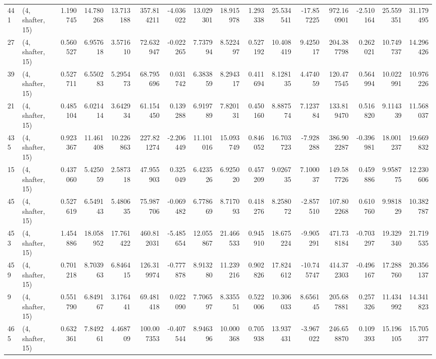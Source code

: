 \begin{tabular}{llrrrrrrrrrrrrrr}
441 &  (4, shafter, 15) &   1.190745 &  14.780268 &  13.713188 &   357.814211 &  -4.036022 &  13.029301 &  18.915978 &  1.293338 &  25.534541 & -17.857225 &   972.160901 & -2.510164 &  25.559351 &  31.179495 \\
27  &  (4, shafter, 15) &   0.560527 &   6.957618 &   3.571610 &    72.632947 &  -0.022265 &   7.737994 &   8.522497 &  0.527192 &  10.408419 &   9.425017 &   204.387798 &  0.262021 &  10.749737 &  14.296426 \\
39  &  (4, shafter, 15) &   0.527711 &   6.550283 &   5.295473 &    68.795696 &   0.031742 &   6.383859 &   8.294317 &  0.411694 &   8.128135 &   4.474059 &   120.477545 &  0.564994 &  10.022991 &  10.976226 \\
21  &  (4, shafter, 15) &   0.485104 &   6.021414 &   3.642934 &    61.154450 &   0.139288 &   6.919789 &   7.820131 &  0.450160 &   8.887574 &   7.123784 &   133.819470 &  0.516820 &   9.114339 &  11.568037 \\
435 &  (4, shafter, 15) &   0.923367 &  11.461408 &  10.226863 &   227.821274 &  -2.206449 &  11.101016 &  15.093749 &  0.846052 &  16.703723 &  -7.928288 &   386.902287 & -0.396981 &  18.001237 &  19.669832 \\
15  &  (4, shafter, 15) &   0.437060 &   5.425059 &   2.587318 &    47.955903 &   0.325049 &   6.423526 &   6.925020 &  0.457209 &   9.026735 &   7.100037 &   149.587726 &  0.459886 &   9.958775 &  12.230606 \\
45  &  (4, shafter, 15) &   0.527619 &   6.549143 &   5.480635 &    75.987706 &  -0.069482 &   6.778669 &   8.717093 &  0.418276 &   8.258072 &  -2.857510 &   107.802268 &  0.610760 &   9.981829 &  10.382787 \\
453 &  (4, shafter, 15) &   1.454886 &  18.058952 &  17.761422 &   460.812031 &  -5.485654 &  12.055867 &  21.466533 &  0.945910 &  18.675224 &  -9.905291 &   471.738184 & -0.703297 &  19.329340 &  21.719535 \\
459 &  (4, shafter, 15) &   0.701218 &   8.703963 &   6.846415 &   126.319974 &  -0.777878 &   8.913280 &  11.239216 &  0.902826 &  17.824612 & -10.745747 &   414.372303 & -0.496167 &  17.288760 &  20.356137 \\
9   &  (4, shafter, 15) &   0.551790 &   6.849167 &   3.176441 &    69.481418 &   0.022090 &   7.706597 &   8.335551 &  0.522006 &  10.306033 &   8.656145 &   205.687881 &  0.257326 &  11.434992 &  14.341823 \\
465 &  (4, shafter, 15) &   0.632361 &   7.849261 &   4.468709 &   100.007353 &  -0.407544 &   8.946396 &  10.000368 &  0.705938 &  13.937431 &  -3.967022 &   246.658870 &  0.109393 &  15.196105 &  15.705377 \\

\end{tabular}
